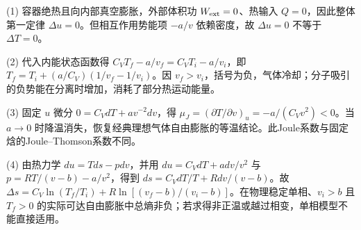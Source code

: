 (1) 容器绝热且向内部真空膨胀，外部体积功 \(W_{\rm ext}=0\)、热输入 \(Q=0\)，因此整体第一定律 \(\Delta u=0\)。但相互作用势能项 \(-a/v\) 依赖密度，故 \(\Delta u=0\) 不等于 \(\Delta T=0\)。

(2) 代入内能状态函数得 \(C_VT_f-a/v_f=C_VT_i-a/v_i\)，即 \(\boxed{T_f=T_i+(a/C_V)(1/v_f-1/v_i)}\)。因 \(v_f>v_i\)，括号为负，气体冷却；分子吸引的负势能在分离时增加，消耗了部分热运动能量。

(3) 固定 \(u\) 微分 \(0=C_VdT+a v^{-2}dv\)，得 \(\boxed{\mu_J=(\partial T/\partial v)_u=-a/(C_Vv^2)<0}\)。当 \(a\to0\) 时降温消失，恢复经典理想气体自由膨胀的等温结论。此Joule系数与固定焓的Joule–Thomson系数不同。

(4) 由热力学 \(du=Tds-pdv\)，并用 \(du=C_VdT+a dv/v^2\) 与 \(p=RT/(v-b)-a/v^2\)，得到 \(ds=C_VdT/T+Rdv/(v-b)\)。故 \(\boxed{\Delta s=C_V\ln(T_f/T_i)+R\ln[(v_f-b)/(v_i-b)]}\)。在物理稳定单相、\(v_i>b\) 且 \(T_f>0\) 的实际可达自由膨胀中总熵非负；若求得非正温或越过相变，单相模型不能直接适用。
